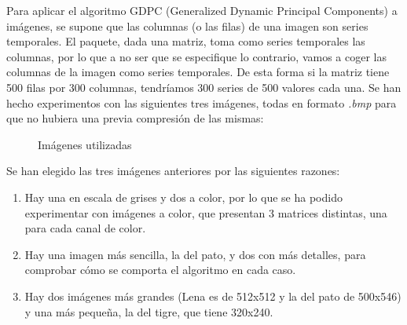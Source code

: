 Para aplicar el algoritmo GDPC (Generalized Dynamic Principal Components) a imágenes, se supone que las columnas (o las filas) de una imagen son series temporales. El paquete, dada una matriz, toma como series temporales las columnas, por lo que a no ser que se especifique lo contrario, vamos a coger las columnas de la imagen como series temporales. De esta forma si la matriz tiene 500 filas por 300 columnas, tendríamos 300 series de 500 valores cada una. Se han hecho experimentos con las siguientes tres imágenes, todas en formato \textit{.bmp} para que no hubiera una previa compresión de las mismas:
\begin{figure}[H]
 \centering
 \caption{Imágenes utilizadas}
 \label{f:imgs}
\end{figure}

Se han elegido las tres imágenes anteriores por las siguientes razones:
\begin{enumerate}
\item Hay una en escala de grises y dos a color, por lo que se ha podido experimentar con imágenes a color, que presentan 3 matrices distintas, una para cada canal de color.
\item Hay una imagen más sencilla, la del pato, y dos con más detalles, para comprobar cómo se comporta el algoritmo en cada caso.
\item Hay dos imágenes más grandes (Lena es de 512x512 y la del pato de 500x546) y una más pequeña, la del tigre, que tiene 320x240.
\end{enumerate}

